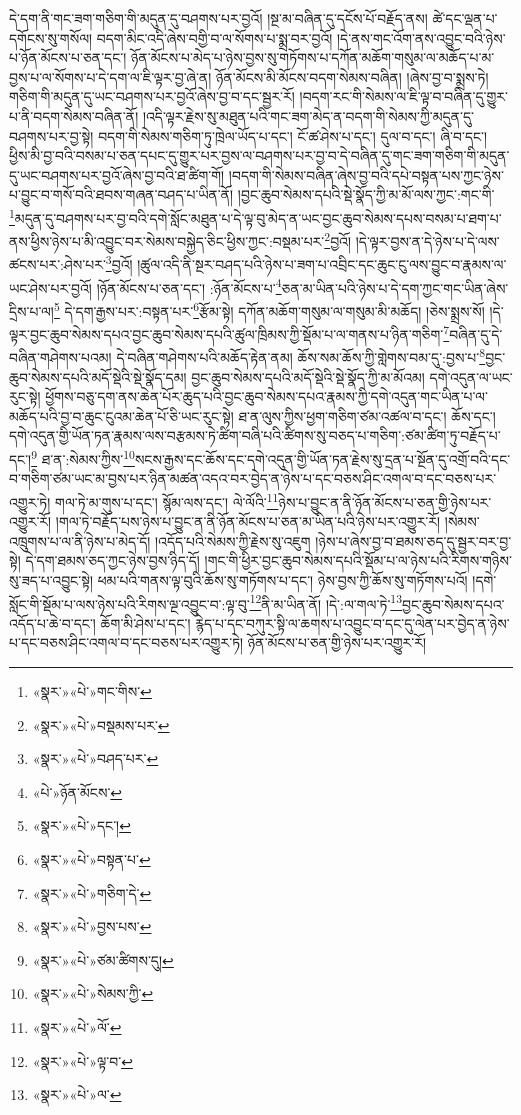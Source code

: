 དེ་དག་ནི་གང་ཟག་གཅིག་གི་མདུན་དུ་བཤགས་པར་བྱའོ། །སྔ་མ་བཞིན་དུ་དངོས་པོ་བརྗོད་ནས། ཚེ་དང་ལྡན་པ་དགོངས་སུ་གསོལ། བདག་མིང་འདི་ཞེས་བགྱི་བ་ལ་སོགས་པ་སྨྲ་བར་བྱའོ། །དེ་ནས་གང་འོག་ནས་འབྱུང་བའི་ཉེས་པ་ཉོན་མོངས་པ་ཅན་དང་། ཉོན་མོངས་པ་མེད་པ་ཉེས་བྱས་སུ་གཏོགས་པ་དཀོན་མཆོག་གསུམ་ལ་མཆོད་པ་མ་བྱས་པ་ལ་སོགས་པ་དེ་དག་ལ་ཇི་ལྟར་བྱ་ཞེ་ན། ཉོན་མོངས་མི་མོངས་བདག་སེམས་བཞིན། །ཞེས་བྱ་བ་སྨྲས་ཏེ། གཅིག་གི་མདུན་དུ་ཡང་བཤགས་པར་བྱའོ་ཞེས་བྱ་བ་དང་སྦྱར་རོ། །བདག་རང་གི་སེམས་ལ་ཇི་ལྟ་བ་བཞིན་དུ་གྱུར་པ་ནི་བདག་སེམས་བཞིན་ནོ། །འདི་ལྟར་རྗེས་སུ་མཐུན་པའི་གང་ཟག་མེད་ན་བདག་གི་སེམས་ཀྱི་མདུན་དུ་བཤགས་པར་བྱ་སྟེ། བདག་གི་སེམས་གཅིག་ཏུ་ཁྲེལ་ཡོད་པ་དང་། ངོ་ཚ་ཤེས་པ་དང་། དུལ་བ་དང་། ཞི་བ་དང་། ཕྱིས་མི་བྱ་བའི་བསམ་པ་ཅན་དཔང་དུ་གྱུར་པར་བྱས་ལ་བཤགས་པར་བྱ་བ་དེ་བཞིན་དུ་གང་ཟག་གཅིག་གི་མདུན་དུ་ཡང་བཤགས་པར་བྱའོ་ཞེས་བྱ་བའི་ཐ་ཚིག་གོ། །བདག་གི་སེམས་བཞིན་ཞེས་བྱ་བའི་དཔེ་བསྟན་པས་ཀྱང་ཉེས་པ་བྱུང་བ་གསོ་བའི་ཐབས་གཞན་བཤད་པ་ཡིན་ནོ། །བྱང་ཆུབ་སེམས་དཔའི་སྡེ་སྣོད་ཀྱི་མ་མོ་ལས་ཀྱང་:གང་གི་\footnote{«སྣར་»«པེ་»གང་གིས་}མདུན་དུ་བཤགས་པར་བྱ་བའི་དགེ་སློང་མཐུན་པ་དེ་ལྟ་བུ་མེད་ན་ཡང་བྱང་ཆུབ་སེམས་དཔས་བསམ་པ་ཐག་པ་ནས་ཕྱིས་ཉེས་པ་མི་འབྱུང་བར་སེམས་བསྐྱེད་ཅིང་ཕྱིས་ཀྱང་:བསྡམ་པར་\footnote{«སྣར་»«པེ་»བསྡམས་པར་}བྱའོ། །དེ་ལྟར་བྱས་ན་དེ་ཉེས་པ་དེ་ལས་ཚངས་པར་:ཤེས་པར་\footnote{«སྣར་»«པེ་»བཤད་པར་}བྱའོ། །ཚུལ་འདི་ནི་སྔར་བཤད་པའི་ཉེས་པ་ཟག་པ་འབྲིང་དང་ཆུང་ངུ་ལས་བྱུང་བ་རྣམས་ལ་ཡང་ཤེས་པར་བྱའོ། །ཉོན་མོངས་པ་ཅན་དང་། :ཉོན་མོངས་པ་\footnote{«པེ་»ཉོན་མོངས་}ཅན་མ་ཡིན་པའི་ཉེས་པ་དེ་དག་ཀྱང་གང་ཡིན་ཞེས་དྲིས་པ་ལ།\footnote{«སྣར་»«པེ་»དང་།} དེ་དག་རྒྱས་པར་:བསྟན་པར་\footnote{«སྣར་»«པེ་»བསྟན་པ་}རྩོམ་སྟེ། དཀོན་མཆོག་གསུམ་ལ་གསུམ་མི་མཆོད། །ཅེས་སྨྲས་སོ། །དེ་ལྟར་བྱང་ཆུབ་སེམས་དཔའ་བྱང་ཆུབ་སེམས་དཔའི་ཚུལ་ཁྲིམས་ཀྱི་སྡོམ་པ་ལ་གནས་པ་ཉིན་གཅིག་\footnote{«སྣར་»«པེ་»གཅིག་དེ་}བཞིན་དུ་དེ་བཞིན་གཤེགས་པའམ། དེ་བཞིན་གཤེགས་པའི་མཆོད་རྟེན་ནམ། ཆོས་སམ་ཆོས་ཀྱི་གླེགས་བམ་དུ་:བྱས་པ་\footnote{«སྣར་»«པེ་»བྱས་པས་}བྱང་ཆུབ་སེམས་དཔའི་མདོ་སྡེའི་སྡེ་སྣོད་དམ། བྱང་ཆུབ་སེམས་དཔའི་མདོ་སྡེའི་སྡེ་སྣོད་ཀྱི་མ་མོའམ། དགེ་འདུན་ལ་ཡང་རུང་སྟེ། ཕྱོགས་བཅུ་དག་ནས་ཆེན་པོར་ཆུད་པའི་བྱང་ཆུབ་སེམས་དཔའ་རྣམས་ཀྱི་དགེ་འདུན་གང་ཡིན་པ་ལ་མཆོད་པའི་བྱ་བ་ཆུང་ངུའམ་ཆེན་པོ་ཅི་ཡང་རུང་སྟེ། ཐ་ན་ལུས་ཀྱིས་ཕྱག་གཅིག་ཙམ་འཚལ་བ་དང་། ཆོས་དང་། དགེ་འདུན་གྱི་ཡོན་ཏན་རྣམས་ལས་བརྩམས་ཏེ་ཚིག་བཞི་པའི་ཚིགས་སུ་བཅད་པ་གཅིག་:ཙམ་ཚིག་ཏུ་བརྗོད་པ་དང་།\footnote{«སྣར་»«པེ་»ཙམ་ཚིགས་དུ།} ཐ་ན་:སེམས་ཀྱིས་\footnote{«སྣར་»«པེ་»སེམས་ཀྱི་}སངས་རྒྱས་དང་ཆོས་དང་དགེ་འདུན་གྱི་ཡོན་ཏན་རྗེས་སུ་དྲན་པ་སྔོན་དུ་འགྲོ་བའི་དང་བ་གཅིག་ཙམ་ཡང་མ་བྱས་པར་ཉིན་མཚན་འདའ་བར་བྱེད་ན་ཉེས་པ་དང་བཅས་ཤིང་འགལ་བ་དང་བཅས་པར་འགྱུར་ཏེ། གལ་ཏེ་མ་གུས་པ་དང་། སྙོམ་ལས་དང་། ལེ་ལོའི་\footnote{«སྣར་»«པེ་»ལོ་}ཉེས་པ་བྱུང་ན་ནི་ཉོན་མོངས་པ་ཅན་གྱི་ཉེས་པར་འགྱུར་རོ། །གལ་ཏེ་བརྗོད་པས་ཉེས་པ་བྱུང་ན་ནི་ཉོན་མོངས་པ་ཅན་མ་ཡིན་པའི་ཉེས་པར་འགྱུར་རོ། །སེམས་འཁྲུགས་པ་ལ་ནི་ཉེས་པ་མེད་དོ། །འདོད་པའི་སེམས་ཀྱི་རྗེས་སུ་འཇུག །ཉེས་པ་ཞེས་བྱ་བ་ཐམས་ཅད་དུ་སྦྱར་བར་བྱ་སྟེ། དེ་དག་ཐམས་ཅད་ཀྱང་ཉེས་བྱས་ཉིད་དོ། །གང་གི་ཕྱིར་བྱང་ཆུབ་སེམས་དཔའི་སྡོམ་པ་ལ་ཉེས་པའི་རིགས་གཉིས་སུ་ཟད་པ་འབྱུང་སྟེ། ཕམ་པའི་གནས་ལྟ་བུའི་ཆོས་སུ་གཏོགས་པ་དང་། ཉེས་བྱས་ཀྱི་ཆོས་སུ་གཏོགས་པའོ། །དགེ་སློང་གི་སྡོམ་པ་ལས་ཉེས་པའི་རིགས་ལྔ་འབྱུང་བ་:ལྟ་བུ་\footnote{«སྣར་»«པེ་»ལྟ་བ་}ནི་མ་ཡིན་ནོ། །དེ་:ལ་གལ་ཏེ་\footnote{«སྣར་»«པེ་»ལ་}བྱང་ཆུབ་སེམས་དཔའ་འདོད་པ་ཆེ་བ་དང་། ཆོག་མི་ཤེས་པ་དང་། རྙེད་པ་དང་བཀུར་སྟི་ལ་ཆགས་པ་འབྱུང་བ་དང་དུ་ལེན་པར་བྱེད་ན་ཉེས་པ་དང་བཅས་ཤིང་འགལ་བ་དང་བཅས་པར་འགྱུར་ཏེ། ཉོན་མོངས་པ་ཅན་གྱི་ཉེས་པར་འགྱུར་རོ། 